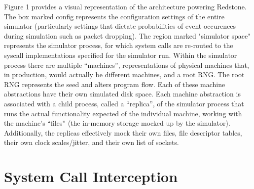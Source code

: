 {\fontsize{12}{15}\selectfont 
Figure 1 provides a visual representation of the architecture powering Redstone.
The box marked config represents the configuration settings of the entire simulator (particularly settings that dictate probabilities of event occurences during simulation such as packet dropping). The region marked "simulator space" represents the simulator process,
for which system calls are re-routed to the syscall implementations specified for the simulator run.
Within the simulator process there are multiple “machines”,
representations of physical machines that, in production, would actually be different machines, and a root RNG. The root RNG represents the seed and alters program flow.
Each of these machine abstractions have their own simulated disk space.
Each machine abstraction is associated with a child process,
called a “replica”,
of the simulator process that runs the actual functionality expected of the individual machine,
working with the machine’s “files” (the in-memory storage mocked up by the simulator). Additionally, the replicas effectively mock their own files, file descriptor tables, their own clock scales/jitter, and their own list of sockets.

}

\section{\txtrsdust System Call Interception}

